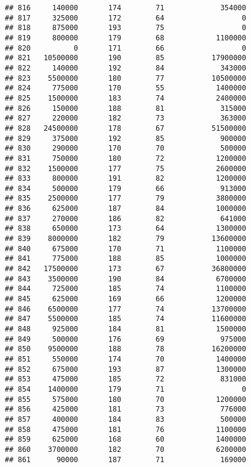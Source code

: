 \documentclass[
]{article}
\begin{document}
\begin{verbatim}
## 816     140000       174        71             354000
## 817     325000       172        64                  0
## 818     875000       193        75                  0
## 819     800000       179        68            1100000
## 820          0       171        66                  0
## 821   10500000       190        85           17900000
## 822     140000       192        84             343000
## 823    5500000       180        77           10500000
## 824     775000       170        55            1400000
## 825    1500000       183        74            2400000
## 826     150000       188        81             315000
## 827     220000       182        73             363000
## 828   24500000       178        67           51500000
## 829     375000       192        85             900000
## 830     290000       170        70             500000
## 831     750000       180        72            1200000
## 832    1500000       177        75            2600000
## 833     800000       191        82            1200000
## 834     500000       179        66             913000
## 835    2500000       177        79            3800000
## 836     625000       187        84            1000000
## 837     270000       186        82             641000
## 838     650000       173        64            1300000
## 839    8000000       182        79           13600000
## 840     675000       170        71            1100000
## 841     775000       188        85            1000000
## 842   17500000       173        67           36800000
## 843    3500000       190        84            6700000
## 844     725000       185        74            1100000
## 845     625000       169        66            1200000
## 846    6500000       177        74           13700000
## 847    5500000       185        74           11600000
## 848     925000       184        81            1500000
## 849     500000       176        69             975000
## 850    9500000       188        78           16200000
## 851     550000       174        70            1400000
## 852     675000       193        87            1300000
## 853     475000       185        72             831000
## 854    1400000       179        71                  0
## 855     575000       180        70            1200000
## 856     425000       181        73             776000
## 857     400000       184        83             500000
## 858     475000       181        76            1100000
## 859     625000       168        60            1400000
## 860    3700000       182        70            6200000
## 861      90000       187        71             169000

\end{verbatim}
\end{document}
